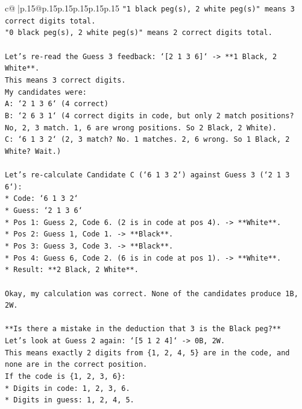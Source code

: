 \documentclass{article}
\begin{document}
{\begin{supertabular}{c@{$\;$}|p{.15\linewidth}@{}p{.15\linewidth}p{.15\linewidth}p{.15\linewidth}p{.15\linewidth}p{.15\linewidth}}
{{{\texttt{"1 black peg(s), 2 white peg(s)" means 3 correct digits total.} \\
\texttt{"0 black peg(s), 2 white peg(s)" means 2 correct digits total.} \\
\\ 
\texttt{Let's re{-}read the Guess 3 feedback: `{[}2 1 3 6{]}` {-}> **1 Black, 2 White**.} \\
\texttt{This means 3 correct digits.} \\
\texttt{My candidates were:} \\
\texttt{A: `2 1 3 6` (4 correct)} \\
\texttt{B: `2 6 3 1` (4 correct digits in code, but only 2 match positions? No, 2, 3 match. 1, 6 are wrong positions. So 2 Black, 2 White).} \\
\texttt{C: `6 1 3 2` (2, 3 match? No. 1 matches. 2, 6 wrong. So 1 Black, 2 White? Wait.)} \\
\\ 
\texttt{Let's re{-}calculate Candidate C (`6 1 3 2`) against Guess 3 (`2 1 3 6`):} \\
\texttt{*   Code: `6 1 3 2`} \\
\texttt{*   Guess: `2 1 3 6`} \\
\texttt{*   Pos 1: Guess 2, Code 6. (2 is in code at pos 4). {-}> **White**.} \\
\texttt{*   Pos 2: Guess 1, Code 1. {-}> **Black**.} \\
\texttt{*   Pos 3: Guess 3, Code 3. {-}> **Black**.} \\
\texttt{*   Pos 4: Guess 6, Code 2. (6 is in code at pos 1). {-}> **White**.} \\
\texttt{*   Result: **2 Black, 2 White**.} \\
\\ 
\texttt{Okay, my calculation was correct. None of the candidates produce 1B, 2W.} \\
\\ 
\texttt{**Is there a mistake in the deduction that 3 is the Black peg?**} \\
\texttt{Let's look at Guess 2 again: `{[}5 1 2 4{]}` {-}> 0B, 2W.} \\
\texttt{This means exactly 2 digits from \{1, 2, 4, 5\} are in the code, and none are in the correct position.} \\
\texttt{If the code is \{1, 2, 3, 6\}:} \\
\texttt{*   Digits in code: 1, 2, 3, 6.} \\
\texttt{*   Digits in guess: 1, 2, 4, 5.} \\
}}}
\end{supertabular}}
\end{document}
